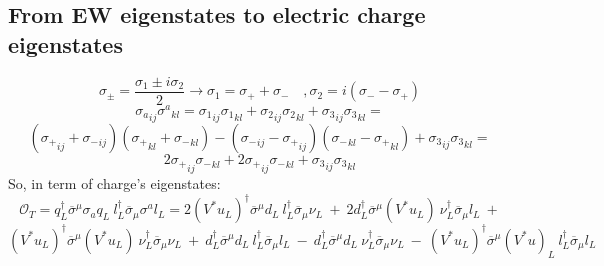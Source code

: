 \documentclass{article}
\begin{document}
\subsection{From EW eigenstates to electric charge eigenstates}
\[
\sigma_\pm = \frac{\sigma_1 \pm i \sigma_2}{2} \rightarrow \sigma_1 = \sigma_+ + \sigma_- \quad , \sigma_2 = i(\sigma_- - \sigma_+ ) 
\]
\[
{\sigma_a}_{ij} {\sigma^a}_{kl} = {\sigma_1}_{ij} {\sigma_1}_{kl} +{\sigma_2}_{ij} {\sigma_2}_{kl} + {\sigma_3}_{ij} {\sigma_3}_{kl} =
\]
\[
({\sigma_+}_{ij} + {\sigma_-}_{ij}) ({\sigma_+}_{kl} + {\sigma_-}_{kl}) -({\sigma_-}_{ij} - {\sigma_+}_{ij}) ({\sigma_-}_{kl}- {\sigma_+}_{kl}) + {\sigma_3}_{ij} {\sigma_3}_{kl}=
\]
\[
2{\sigma_+}_{ij} {\sigma_-}_{kl} + 2 {\sigma_+}_{ij} {\sigma_-}_{kl} + {\sigma_3}_{ij} {\sigma_3}_{kl}
\]
So, in term of charge's eigenstates:
\[
\mathcal{O}_T=q_L^\dagger \overline{\sigma}^\mu  \sigma_a q_L \ l_L^\dagger \overline{\sigma}_\mu \sigma^a l_L= 2 (V^* u_L)^\dagger \overline{\sigma}^\mu   d_L \ l_L^\dagger \overline{\sigma}_\mu \nu_L
 \ + \ 2 d_L^\dagger \overline{\sigma}^\mu  (V^* u_L) \ \nu_L^\dagger \overline{\sigma}_\mu  l_L
\ + 
\]
\[
 (V^* u_L)^\dagger \overline{\sigma}^\mu  (V^* u_L) \ \nu_L^\dagger \overline{\sigma}_\mu  \nu_L \ + \ d_L^\dagger \overline{\sigma}^\mu  d_L \ l_L^\dagger \overline{\sigma}_\mu  l_L \  - \ d_L^\dagger \overline{\sigma}^\mu   d_L \ \nu_L^\dagger \overline{\sigma}_\mu  \nu_L \ - \ (V^* u_L)^\dagger \overline{\sigma}^\mu (V^* u)_L \ l_L^\dagger \overline{\sigma}_\mu  l_L
 \] 
\end{document}
